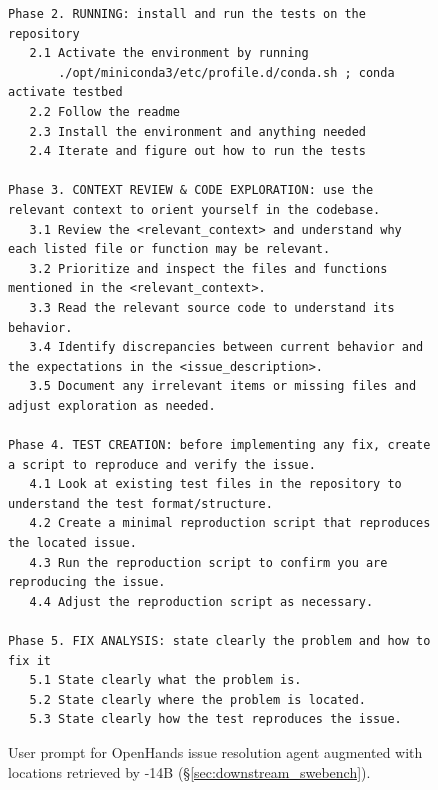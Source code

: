 \begin{figure}[!h]
\begin{tcolorbox}[colback=blue!6!white, colframe=blue!45!white, title={\small User Prompt for OpenHands Issue Resolution Agent Augmented with Locations Retrieved by \methodname-14B (continued)}]
\begin{lstlisting}[basicstyle=\fontsize{6.5}{8}\ttfamily]
Phase 2. RUNNING: install and run the tests on the repository
   2.1 Activate the environment by running  
       ./opt/miniconda3/etc/profile.d/conda.sh ; conda activate testbed
   2.2 Follow the readme
   2.3 Install the environment and anything needed
   2.4 Iterate and figure out how to run the tests

Phase 3. CONTEXT REVIEW & CODE EXPLORATION: use the relevant context to orient yourself in the codebase.
   3.1 Review the <relevant_context> and understand why each listed file or function may be relevant.
   3.2 Prioritize and inspect the files and functions mentioned in the <relevant_context>.
   3.3 Read the relevant source code to understand its behavior.
   3.4 Identify discrepancies between current behavior and the expectations in the <issue_description>.
   3.5 Document any irrelevant items or missing files and adjust exploration as needed.

Phase 4. TEST CREATION: before implementing any fix, create a script to reproduce and verify the issue.
   4.1 Look at existing test files in the repository to understand the test format/structure.
   4.2 Create a minimal reproduction script that reproduces the located issue.
   4.3 Run the reproduction script to confirm you are reproducing the issue.
   4.4 Adjust the reproduction script as necessary.

Phase 5. FIX ANALYSIS: state clearly the problem and how to fix it
   5.1 State clearly what the problem is.
   5.2 State clearly where the problem is located.
   5.3 State clearly how the test reproduces the issue.
\end{lstlisting}
\end{tcolorbox}
\caption{User prompt for OpenHands issue resolution agent augmented with locations retrieved by \methodname-14B (\S\ref{sec:downstream_swebench}).}
\label{fig:user_prompt_codescout_augment1}
\end{figure}
